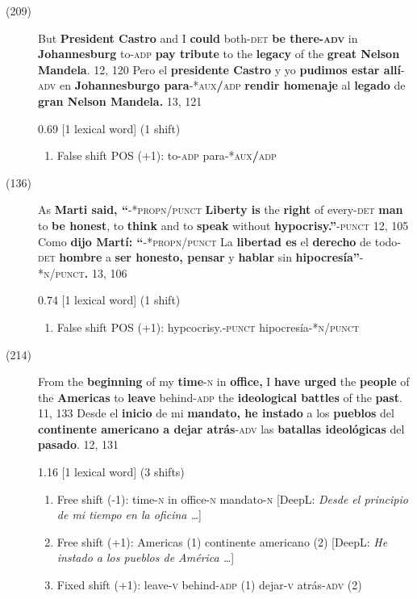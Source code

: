 \documentclass[output=paper]{langsci/langscibook}
\begin{document}
\begin{description}
  \item[(209)] But \textbf{President Castro} and I \textbf{could} both\textsc{-det} \textbf{be there}\textbf{\textsc{-adv}} in \textbf{Johannesburg} to\textsc{-adp} \textbf{pay tribute} to the \textbf{legacy} of the \textbf{great Nelson} \textbf{Mandela}. 12, 120 \rightarrow Pero el \textbf{presidente Castro} y yo \textbf{pudimos estar allí}\textsc{-adv} en \textbf{Johannesburgo para}\textsc{-*aux}\textbf{/}\textsc{adp} \textbf{rendir homenaje} al \textbf{legado} de \textbf{gran Nelson Mandela.} 13, 121

    0.69 [1 lexical word] (1 shift)

    \begin{enumerate}
      \item False shift POS (+1): to\textsc{-adp} \rightarrow para\textsc{-*aux}\textbf{/}\textsc{adp}
    \end{enumerate}

  \item[(136)] As \textbf{Marti said, “}\textsc{-*propn/punct} \textbf{Liberty is} the \textbf{right} of every\textsc{-det} \textbf{man} to \textbf{be honest}, to \textbf{think} and to \textbf{speak} without \textbf{hypocrisy.”}\textsc{-punct} 12, 105 \rightarrow Como \textbf{dijo Martí: “}\textsc{-*propn/punct} La \textbf{libertad es} el \textbf{derecho} de todo\textsc{-det} \textbf{hombre} a \textbf{ser honesto, pensar} y \textbf{hablar} sin \textbf{hipocresía”}\textsc{-*n/punct}\textbf{.} 13, 106

    0.74 [1 lexical word] (1 shift)

    \begin{enumerate}
      \item False shift POS (+1): \textsc{ }hypcocrisy.-\textsc{punct} \rightarrow hipocresía\textsc{-*n/punct}
    \end{enumerate}

  \item[(214)] From the \textbf{beginning} of my \textbf{time}\textsc{-n} in \textbf{office,} I \textbf{have urged} the \textbf{people} of the \textbf{Americas} to \textbf{leave} behind\textsc{-adp} the \textbf{ideological battles} of the \textbf{past}. 11, 133 \rightarrow Desde el \textbf{inicio} de mi \textbf{mandato, he instado} a los \textbf{pueblos} del \textbf{continente americano a dejar atrás}\textsc{-adv} las \textbf{batallas ideológicas} del\textbf{ pasado}. 12, 131

    1.16 [1 lexical word] (3 shifts)

    \begin{enumerate}
      \item Free shift (-1): time\textsc{-n} in office-\textsc{n} \rightarrow mandato-\textsc{n }[DeepL: \textit{Desde el principio de mi tiempo en la oficina \dots}]
      \item Free shift (+1): Americas (1) \rightarrow continente americano (2) [DeepL: \textit{He instado a los pueblos de América \dots}]
      \item Fixed shift (+1): leave-\textsc{v} behind\textsc{-adp} (1) \rightarrow dejar-\textsc{v} atrás-\textsc{adv} (2)
    \end{enumerate}


\end{description}
\end{document}
